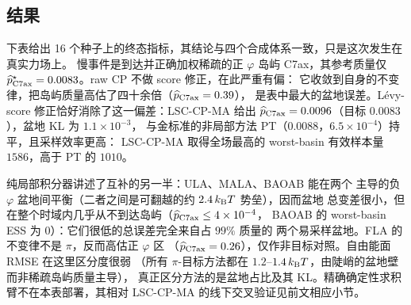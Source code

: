 \documentclass[11pt,a4paper]{article}
\renewcommand{\textsc}[1]{\textsf{\MakeUppercase{#1}}}
\begin{document}
\subsection{结果}

下表给出 16 个种子上的终态指标，其结论与四个合成体系一致，只是这次发生在真实力场上。
慢事件是到达并正确加权稀疏的正 $\varphi$ 岛屿 C7ax，其参考质量仅
$\widehat p^\star_{\rm C7ax}=0.0083$。raw \textsc{cp} 不做 score 修正，在此严重有偏：
它收敛到自身的不变律，把岛屿质量高估了四十余倍（$\widehat p_{\rm C7ax}=0.39$），
是表中最大的盆地误差。L\'evy-score 修正恰好消除了这一偏差：\textsc{lsc-cp-ma} 给出
$\widehat p_{\rm C7ax}=0.0096$（目标 $0.0083$），盆地 KL 为 $1.1\times10^{-3}$，
与金标准的非局部方法 \textsc{pt}（$0.0088$，$6.5\times10^{-4}$）持平，且采样效率更高：
\textsc{lsc-cp-ma} 取得全场最高的 worst-basin 有效样本量 $1586$，高于 \textsc{pt} 的
$1010$。

纯局部积分器讲述了互补的另一半：\textsc{ula}、\textsc{mala}、\textsc{baoab} 能在两个
主导的负 $\varphi$ 盆地间平衡（二者之间是可翻越的约 $2.4\,k_{\rm B}T$ 势垒），因而盆地
总变差很小，但在整个时域内几乎从不到达岛屿（$\widehat p_{\rm C7ax}\le4\times10^{-4}$，
\textsc{baoab} 的 worst-basin ESS 为 $0$）：它们很低的总误差完全来自占 $99\%$ 质量的
两个易采样盆地。\textsc{fla} 的不变律不是 $\pi$，反而高估正 $\varphi$ 区
（$\widehat p_{\rm C7ax}=0.26$），仅作非目标对照。自由能面 RMSE 在这里区分度很弱
（所有 $\pi$-目标方法都在 $1.2$--$1.4\,k_{\rm B}T$，由陡峭的盆地壁而非稀疏岛屿质量主导），
真正区分方法的是盆地占比及其 KL。精确确定性求积臂不在本表部署，其相对
\textsc{lsc-cp-ma} 的线下交叉验证见前文相应小节。
\end{document}
